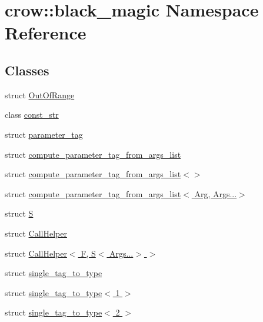 \hypertarget{namespacecrow_1_1black__magic}{\section{crow\-:\-:black\-\_\-magic Namespace Reference}
\label{namespacecrow_1_1black__magic}
}
\subsection*{Classes}
\begin{DoxyCompactItemize}
\item 
struct \hyperlink{structcrow_1_1black__magic_1_1_out_of_range}{Out\-Of\-Range}
\item 
class \hyperlink{classcrow_1_1black__magic_1_1const__str}{const\-\_\-str}
\item 
struct \hyperlink{structcrow_1_1black__magic_1_1parameter__tag}{parameter\-\_\-tag}
\item 
struct \hyperlink{structcrow_1_1black__magic_1_1compute__parameter__tag__from__args__list}{compute\-\_\-parameter\-\_\-tag\-\_\-from\-\_\-args\-\_\-list}
\item 
struct \hyperlink{structcrow_1_1black__magic_1_1compute__parameter__tag__from__args__list_3_4}{compute\-\_\-parameter\-\_\-tag\-\_\-from\-\_\-args\-\_\-list$<$$>$}
\item 
struct \hyperlink{structcrow_1_1black__magic_1_1compute__parameter__tag__from__args__list_3_01_arg_00_01_args_8_8_8_4}{compute\-\_\-parameter\-\_\-tag\-\_\-from\-\_\-args\-\_\-list$<$ Arg, Args...$>$}
\item 
struct \hyperlink{structcrow_1_1black__magic_1_1_s}{S}
\item 
struct \hyperlink{structcrow_1_1black__magic_1_1_call_helper}{Call\-Helper}
\item 
struct \hyperlink{structcrow_1_1black__magic_1_1_call_helper_3_01_f_00_01_s_3_01_args_8_8_8_4_01_4}{Call\-Helper$<$ F, S$<$ Args...$>$ $>$}
\item 
struct \hyperlink{structcrow_1_1black__magic_1_1single__tag__to__type}{single\-\_\-tag\-\_\-to\-\_\-type}
\item 
struct \hyperlink{structcrow_1_1black__magic_1_1single__tag__to__type_3_011_01_4}{single\-\_\-tag\-\_\-to\-\_\-type$<$ 1 $>$}
\item 
struct \hyperlink{structcrow_1_1black__magic_1_1single__tag__to__type_3_012_01_4}{single\-\_\-tag\-\_\-to\-\_\-type$<$ 2 $>$}
\item 

\end{DoxyCompactItemize}
